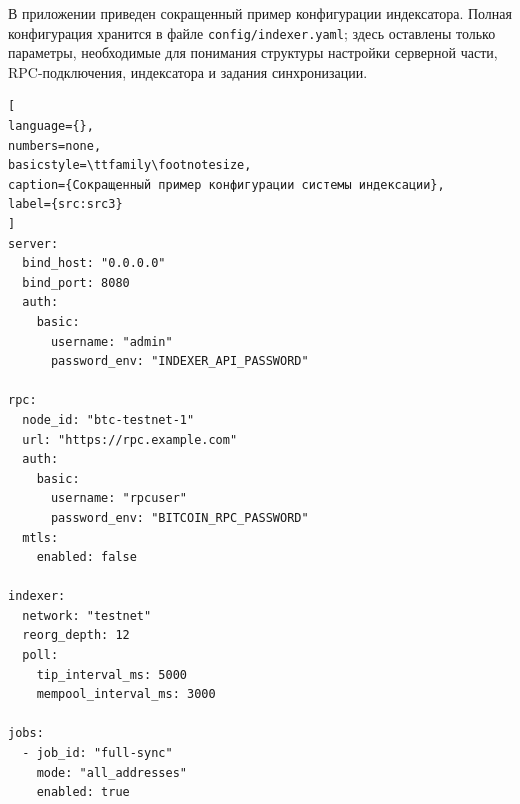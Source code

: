 
В приложении приведен сокращенный пример конфигурации индексатора. Полная
конфигурация хранится в файле \texttt{config/indexer.yaml}; здесь оставлены
только параметры, необходимые для понимания структуры настройки серверной
части, RPC-подключения, индексатора и задания синхронизации.

\begin{lstlisting}[
language={},
numbers=none,
basicstyle=\ttfamily\footnotesize,
caption={Сокращенный пример конфигурации системы индексации},
label={src:src3}
]
server:
  bind_host: "0.0.0.0"
  bind_port: 8080
  auth:
    basic:
      username: "admin"
      password_env: "INDEXER_API_PASSWORD"

rpc:
  node_id: "btc-testnet-1"
  url: "https://rpc.example.com"
  auth:
    basic:
      username: "rpcuser"
      password_env: "BITCOIN_RPC_PASSWORD"
  mtls:
    enabled: false

indexer:
  network: "testnet"
  reorg_depth: 12
  poll:
    tip_interval_ms: 5000
    mempool_interval_ms: 3000

jobs:
  - job_id: "full-sync"
    mode: "all_addresses"
    enabled: true
\end{lstlisting}
